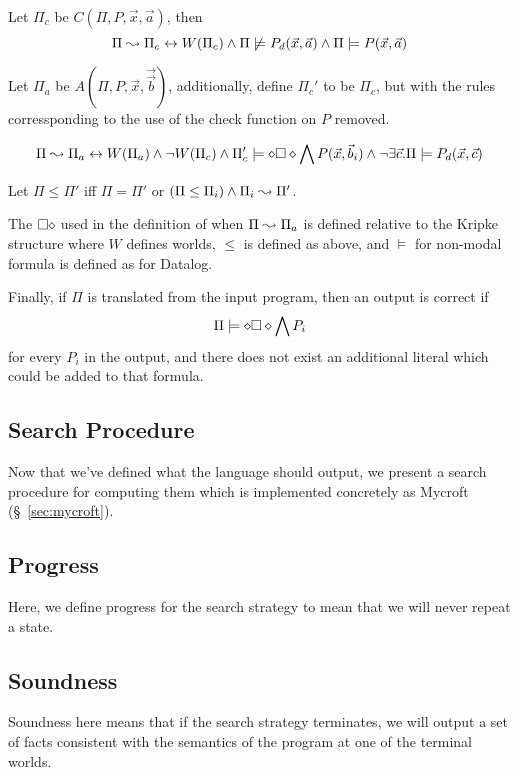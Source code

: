Let $\Pi_c$ be $C(\Pi, P, \vec{x}, \vec{a})$, then
\[
	\Pi \leadsto \Pi_c \leftrightarrow W(\Pi_c) \wedge \Pi \not \models P_d(\vec{x}, \vec{a}) \wedge \Pi \models P(\vec{x}, \vec{a})
\]

Let $\Pi_a$ be $A(\Pi, P, \vec{x}, \vec{\vec{b}})$, additionally, define $\Pi_c'$ to be $\Pi_c$, but with the rules corressponding to the use of the check function on $P$ removed.

\[
	\Pi \leadsto \Pi_a \leftrightarrow W(\Pi_a) \wedge \neg W(\Pi_c) \wedge \Pi_c' \models \diamond \square \diamond \bigwedge P(\vec{x}, \vec{b}_i) \wedge \neg \exists \vec{c}. \Pi \models P_d(\vec{x}, \vec{c})
\]

Let $\Pi \leq \Pi'$ iff $\Pi = \Pi'$ or $(\Pi \leq \Pi_i) \wedge \Pi_i \leadsto \Pi'$.

The $\square \diamond$ used in the definition of when $\Pi \leadsto \Pi_a$ is defined relative to the Kripke structure where $W$ defines worlds, $\leq$ is defined as above, and $\models$ for non-modal formula is defined as for Datalog.

Finally, if $\Pi$ is translated from the input program, then an output is correct if
\[
	\Pi \models \diamond \square \diamond \bigwedge P_i
\]
for every $P_i$ in the output, and there does not exist an additional literal which could be added to that formula.
\subsection{Search Procedure}
\label{sec:search}
Now that we've defined what the language should output, we present a search procedure for computing them which is implemented concretely as Mycroft (\S~\ref{sec:mycroft}).
\subsection{Progress}
\label{sec:progress}
Here, we define progress for the search strategy to mean that we will never repeat a state.
\subsection{Soundness}
\label{sec:soundness}
Soundness here means that if the search strategy terminates, we will output a set of facts consistent with the semantics of the program at one of the terminal worlds.
